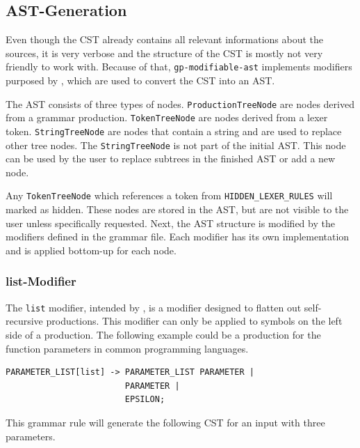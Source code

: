 \subsection{AST-Generation}
\label{chap:ast_generation}

Even though the CST already contains all relevant informations about the sources, it is very verbose and the structure of the CST is mostly not very friendly to work with.
Because of that, \verb|gp-modifiable-ast| implements modifiers purposed by \cite{GeneratingRewritableAST}, which are used to convert the CST into an AST.

The AST consists of three types of nodes. \verb|ProductionTreeNode| are nodes derived from a grammar production. 
\verb|TokenTreeNode| are nodes derived from a lexer token. 
\verb|StringTreeNode| are nodes that contain a string and are used to replace other tree nodes. 
The \verb|StringTreeNode| is not part of the initial AST. This node can be used by the user to replace subtrees in the finished AST or add a new node.
 
Any \verb|TokenTreeNode| which references a token from \verb|HIDDEN_LEXER_RULES| will marked as hidden. 
These nodes are stored in the AST, but are not visible to the user unless specifically requested. 
Next, the AST structure is modified by the modifiers defined in the grammar file. 
Each modifier has its own implementation and is applied bottom-up for each node.

\subsubsection{list-Modifier}

The \verb|list| modifier, intended by \cite{GeneratingRewritableAST}, is a modifier designed to flatten out self-recursive productions. This modifier can only be applied to symbols on the left side of a production. The following example could be a production for the function parameters in common programming languages.

\begin{lstlisting}[caption=list modifier example]
PARAMETER_LIST[list] -> PARAMETER_LIST PARAMETER | 
                        PARAMETER | 
                        EPSILON;
\end{lstlisting}

This grammar rule will generate the following CST for an input with three parameters.



